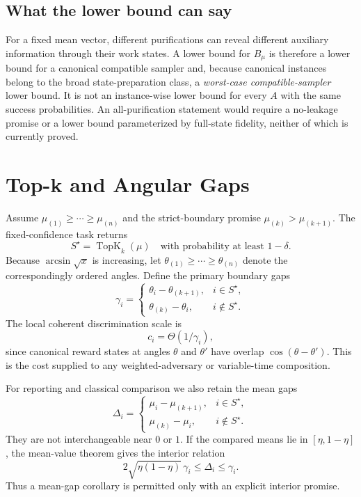 \documentclass[10pt]{article}
\theoremstyle{definition}
\newcommand{\TopK}{\operatorname{TopK}}
\begin{document}
\subsection{What the lower bound can say}

For a fixed mean vector, different purifications can reveal different auxiliary
information through their work states.  A lower bound for $B_\mu$ is therefore a
lower bound for a canonical compatible sampler and, because canonical instances
belong to the broad state-preparation class, a \emph{worst-case compatible-sampler}
lower bound.  It is not an instance-wise lower bound for every $A$ with the same
success probabilities.  An all-purification statement would require a
no-leakage promise or a lower bound parameterized by full-state fidelity, neither
of which is currently proved.

\section{Top-k and Angular Gaps}

Assume $\mu_{(1)}\ge\cdots\ge\mu_{(n)}$ and the strict-boundary promise
$\mu_{(k)}>\mu_{(k+1)}$.  The fixed-confidence task returns
\[
S^\star=\TopK_k(\mu)
\quad\text{with probability at least }1-\delta.
\]
Because $\arcsin\sqrt{x}$ is increasing, let
$\theta_{(1)}\ge\cdots\ge\theta_{(n)}$ denote the correspondingly ordered angles.
Define the primary boundary gaps
\begin{equation}
\gamma_i=
\begin{cases}
\theta_i-\theta_{(k+1)},& i\in S^\star,\\
\theta_{(k)}-\theta_i,& i\notin S^\star.
\end{cases}
\label{eq:angulargap}
\end{equation}
The local coherent discrimination scale is
\begin{equation}
c_i=\Theta(1/\gamma_i),
\label{eq:localcost}
\end{equation}
since canonical reward states at angles $\theta$ and $\theta'$ have overlap
$\cos(\theta-\theta')$.  This is the cost supplied to any weighted-adversary or
variable-time composition.

For reporting and classical comparison we also retain the mean gaps
\begin{equation}
\Delta_i=
\begin{cases}
\mu_i-\mu_{(k+1)},& i\in S^\star,\\
\mu_{(k)}-\mu_i,& i\notin S^\star.
\end{cases}
\end{equation}
They are not interchangeable near $0$ or $1$.  If the compared means lie in
$[\eta,1-\eta]$, the mean-value theorem gives the interior relation
\begin{equation}
2\sqrt{\eta(1-\eta)}\,\gamma_i
\le \Delta_i\le\gamma_i.
\label{eq:interior}
\end{equation}
Thus a mean-gap corollary is permitted only with an explicit interior promise.
\end{document}
